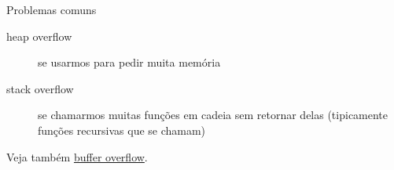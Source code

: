 \documentclass{beamer}
\begin{document}
\begin{frame}{Problemas comuns}

  \begin{description}
  \item[heap overflow] se usarmos  para pedir muita memória
  \item[stack overflow] se chamarmos muitas funções em cadeia sem
    retornar delas (tipicamente funções recursivas que se chamam)
  \end{description}

  Veja também \href{https://en.wikipedia.org/wiki/Buffer_overflow}{buffer overflow}.
   
\end{frame}
\end{document}
